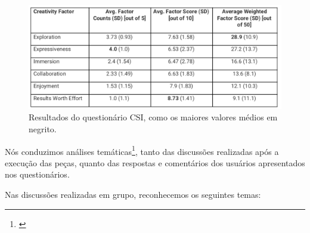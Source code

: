 \begin{figure}

\includegraphics[width=1\textwidth]{pictures/cap4/CSI}
\caption{Resultados do questionário CSI, como os maiores valores médios em negrito.}
\label{fig:questionnaire}
\end{figure}


 

Nós conduzimos análises temáticas\footnote{\cite{Braun2006}}, tanto das discussões realizadas após a execução das peças, quanto das respostas e comentários dos usuários apresentados nos questionários. 

Nas discussões realizadas em grupo, reconhecemos os seguintes temas:

